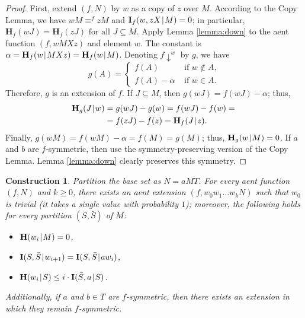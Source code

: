 \documentclass[10pt,a4paper]{amsart}
\def\|{\mskip1.5mu{|}\mskip1.5mu}
\def\H{\mathbf H}
\def\I{\mathbf I}
\newcommand\dn{{\downarrow}}
\newtheorem{construction}{Construction}
\begin{document}
\begin{proof}
First, extend $(f,N)$ by $w$ as a copy of $z$ over $M$. According to the
Copy Lemma, we have $wM\equiv^f zM$ and $\I_f(w,zX\|M)=0$; in
particular, $\H_f(wJ)=\H_f(zJ) \mbox{ for all } J\subseteq M$. Apply Lemma
\ref{lemma:down} to the aent function $(f,wMXz)$ and element $w$. The
constant is $\alpha=\H_f(w\|MXz)=\H_f(w\|M)$. Denoting $f\dn^w$ by $g$,
we have
$$
   g(A) = \begin{cases}
      f(A) & \mbox{ if $w\notin A$}, \\
      f(A)-\alpha & \mbox{ if $w\in A$}.
   \end{cases}
$$
Therefore, $g$ is an extension of $f$. If $J\subseteq M$, then
$g(wJ)=f(wJ)-\alpha$; thus,
\begin{align*}
   \H_g(J\|w)&=g(wJ)-g(w) = f(wJ)-f(w)={}\\
             &=f(zJ)-f(z)=\H_f(J\|z).
\end{align*}
Finally, $g(wM)=f(wM)-\alpha=f(M)=g(M)$; thus, $\H_g(w\|M)=0$.
If $a$ and $b$ are $f$-symmetric, then use the symmetry-preserving version
of the Copy Lemma. Lemma \ref{lemma:down} clearly preserves this symmetry.
\end{proof}

\begin{construction}\label{lemma:Dw}
Partition the base set as $N=aMT$. For every aent function $(f,N)$ and $k\ge
0$, there exists an aent extension $(f,w_0w_1\dots w_kN)$ such that $w_0$ is
trivial (it takes a single value with probability $1$); moreover, the
following holds for every partition $(S,\bar S)$ of $M$:
\begin{itemize}
\item[a)] $\H(w_i\|M)=0$,
\item[b)] $\I(S,\bar S\|w_{i+1}) = \I(S,\bar S\|aw_i)$,
\item[c)] $\H(w_i\|S)\le i\cdot\I(\bar S,a\|S)$.
\end{itemize}
Additionally, if $a$ and $b\in T$ are $f$-symmetric, then there exists an
extension in which they remain $f$-symmetric.
\end{construction}
\end{document}
